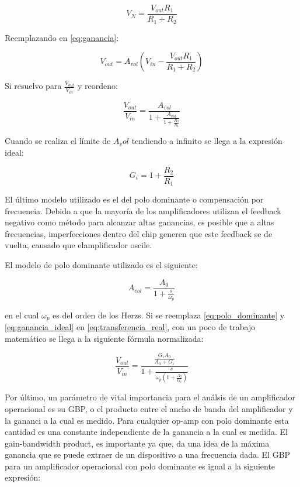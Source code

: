 \begin{equation}
V_N = \frac{V_{out}R_1}{R_1 + R_2}
\end{equation}

Reemplazando en \ref{eq:ganancia}:

\begin{equation}
V_{out} = A_{vol}(V_{in} - \frac{V_{out}R_1}{R_1 + R_2})
\end{equation}

Si resuelvo para $\frac{V_{out}}{V_{in}}$ y reordeno:

\begin{equation}\label{eq:transferencia_real}
\frac{V_{out}}{V_{in}} = \frac{A_{vol}}{1 + \frac{A_{vol}}{1 + \frac{R_2}{R_1}}}
\end{equation}

Cuando se realiza el límite de $A_vol$ tendiendo a infinito se llega a la expresión ideal:

\begin{equation}\label{eq:ganancia_ideal}
G_i = 1 + \frac{R_2}{R_1}
\end{equation}

El último modelo utilizado es el del polo dominante o compensación por frecuencia. Debido a que la mayoría de los amplificadores utilizan el feedback negativo como método para alcanzar altas ganancias, es posible que a altas frecuencias, imperfecciones dentro del chip generen que este feedback se de vuelta, causado que elamplificador oscile. 


El modelo de polo dominante utilizado es el siguiente:

\begin{equation}\label{eq:polo_dominante}
A_{vol} = \frac{A_0}{1 + \frac{s}{\omega_p}}
\end{equation}

en el cual $\omega_p$ es del orden de los Herzs.
Si se reemplaza \ref{eq:polo_dominante} y \ref{eq:ganancia_ideal} en \ref{eq:transferencia_real}, con un poco de trabajo matemático se llega a la siguiente fórmula normalizada:

\begin{equation}\label{eq:ganancia_completa_normalizada}
\frac{V_{out}}{V_{in}} = \frac{\frac{G_iA_0}{A_0 + G_i}}{1 + \frac{s}{\omega_p(1 + \frac{A_0}{G_i})}}
\end{equation}

Por último, un parámetro de vital importancia para el análsis de un amplificador operacional es su GBP, o el producto entre el ancho de banda del amplificador y la gananci a la cual es medido. Para cualquier op-amp con polo dominante esta cantidad es una constante independiente de la ganancia a la cual es medida. El gain-bandwidth product, es importante ya que, da una idea de la máxima ganancia que se puede extraer de un dispositivo a una frecuencia dada. El GBP para un amplificador operacional con polo dominante es igual a la siguiente expresión:

